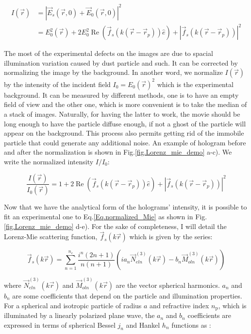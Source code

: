\begin{equation}
	\begin{aligned}
	I(\vec{r}) & = |\vec{E}_s(\vec{r}, 0) + \vec{E}_0(\vec{r}, 0)|^2 \\
	& = E_0^2(\vec{r}) + 2 E_0^2\operatorname{Re} \left(\vec{f}_s(k(\vec{r}- \vec{r}_p)) \hat{e}\right) + | \vec{f}_s(k(\vec{r}- \vec{r}_p)) |^2
	\end{aligned}
\end{equation}

The most of the experimental defects on the images are due to spacial illumination variation caused by dust particle and such. It can be corrected by normalizing the image by the background. In another word, we normalize  $I(\vec{r})$ by the intensity of the incident field $I_0 = E_0(\vec{r})^2$ which is the experimental background. It can be measured by different methods, one is to have an empty field of view and the other one, which is more convenient is to take the median of a stack of images. Naturally, for having the latter to work, the movie should be long enough to have the particle diffuse enough, if not a ghost of the particle will appear on the background. This process also permits getting rid of the immobile particle that could generate any additional noise. An example of hologram before and after the normalization is shown in Fig.\ref{fig.Lorenz_mie_demo} a-c). We write the normalized intensity $I/I_0$:

\begin{equation}
	\frac{I(\vec{r})}{I_0(\vec{r})} = 1 + 2 \operatorname{Re} 
	\left(  
		\vec{f}_s(k(\vec{r}- \vec{r}_p)) \hat{e}
	\right)
	+
	|
		\vec{f}_s(k(\vec{r}- \vec{r}_p))
	|^2
	\label{Eq.normalized_Mie}	
\end{equation}


Now that we have the analytical form of the holograms' intensity, it is possible to fit an experimental one to Eq.\ref{Eq.normalized_Mie} as shown in Fig.\ref{fig.Lorenz_mie_demo} d-e). For the sake of completeness, I will detail the Lorenz-Mie scattering function, $\vec{f}_s(k\vec{r})$ which is given by the series:

\begin{equation}
	\vec{f}_s(k \vec{r}) = \sum _{n=1} ^{n_c} 
	\frac
	{
		i^n (2n +1)
	}
	{
		n(n+1)
	}
	\left(
		i a_n \vec{N}^{(3)}_{eln}(k\vec{r})
		-
		b_n \vec{M}^{(3)}_{oln}(k\vec{r})
	\right)
	\label{Eq.Lorenz-Mie-function}
\end{equation} 


where $\vec{N}^{(3)}_{eln}(k\vec{r})$ and $\vec{M}^{(3)}_{oln}(k\vec{r})$ are the vector spherical harmonics. $a_n$ and $b_n$ are some coefficients that depend on the particle and illumination properties. For a spherical and isotropic particle of radius $a$ and refractive index $n_\mathrm{p}$, which is illuminated by a linearly polarized plane wave, the $a_n$ and $b_n$ coefficients are expressed in terms of spherical Bessel $j_n$ and Hankel $h_n$ functions as \cite{f_bohren_absorption_1998}:


